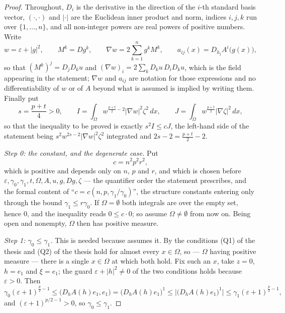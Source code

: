 \begin{proof}
Throughout, $D_i$ is the derivative in the direction of the $i$-th standard
basis vector, $(\cdot,\cdot)$ and $|\cdot|$ are the Euclidean inner product and
norm, indices $i,j,k$ run over $\{1,\dots,n\}$, and all non-integer powers are
real powers of positive numbers.  Write
\[
w=\varepsilon+|g|^2,\qquad
M^k=Dg^k,\qquad
\nabla w=2\sum_{k=1}^ng^kM^k,\qquad
a_{ij}(x)=D_{h_j}A^i\bigl(g(x)\bigr),
\]
so that $(M^k)^j=D_jD_ku$ and $(\nabla w)_i=2\sum_kD_ku\,D_iD_ku$, which is the
field appearing in the statement; $\nabla w$ and $a_{ij}$ are notation for those
expressions and no differentiability of $w$ or of $A$ beyond what is assumed is
implied by writing them.  Finally put
\[
s=\frac{p+t}4>0,\qquad
I=\int_\Omega w^{\frac{p+t}2-2}|\nabla w|^2\zeta^2\,dx,\qquad
J=\int_\Omega w^{\frac{p+t}2}|\nabla\zeta|^2\,dx ,
\]
so that the inequality to be proved is exactly $s^2I\le cJ$, the left-hand side
of the statement being $s^2w^{2s-2}|\nabla w|^2\zeta^2$ integrated and
$2s-2=\frac{p+t}2-2$.

\emph{Step 0: the constant, and the degenerate case.}  Put
\[
c=n^2p^2r^2 ,
\]
which is positive and depends only on $n$, $p$ and $r$, and which is chosen
before $\varepsilon,\gamma_0,\gamma_1,t,\Omega,A,u,g,Dg,\zeta$ --- the
quantifier order the statement prescribes, and the formal content of
``$c=c(n,p,\gamma_1/\gamma_0)$'', the structure constants entering only through
the bound $\gamma_1\le r\gamma_0$.  If $\Omega=\emptyset$ both integrals are
over the empty set, hence $0$, and the inequality reads $0\le c\cdot0$; so
assume $\Omega\ne\emptyset$ from now on.  Being open and nonempty, $\Omega$ then
has positive measure.

\emph{Step 1: $\gamma_0\le\gamma_1$.}  This is needed because
 assumes it.  By
 the conditions (Q1) of the thesis and (Q2) of the thesis
hold for almost every $x\in\Omega$, so --- $\Omega$ having positive measure ---
there is a single $x\in\Omega$ at which both hold.  Fix such an $x$, take $z=0$,
$h=e_1$ and $\xi=e_1$; the guard $\varepsilon+|h|^2\ne0$ of the two conditions
holds because $\varepsilon>0$.  Then
\[
\gamma_0(\varepsilon+1)^{\frac p2-1}
\le\bigl(D_hA(h)e_1,e_1\bigr)=\bigl(D_hA(h)e_1\bigr)^1
\le\bigl|\bigl(D_hA(h)e_1\bigr)^1\bigr|
\le\gamma_1(\varepsilon+1)^{\frac p2-1},
\]
and $(\varepsilon+1)^{p/2-1}>0$, so $\gamma_0\le\gamma_1$.


\end{proof}
